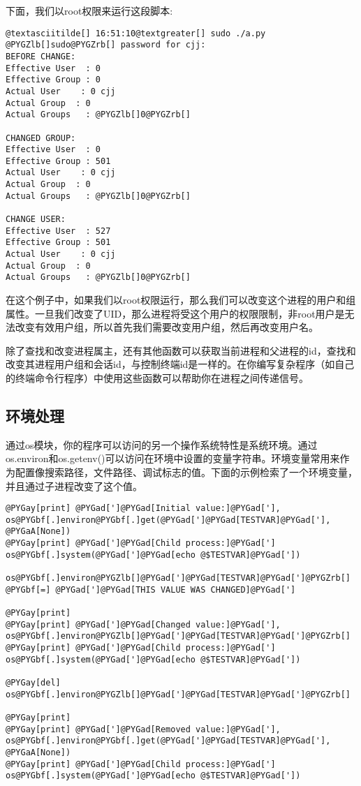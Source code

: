 \documentclass[letterpaper,10pt,english]{manual}
\begin{document}
下面，我们以root权限来运行这段脚本:

\begin{Verbatim}[commandchars=@\[\]]
@textasciitilde[] 16:51:10@textgreater[] sudo ./a.py
@PYGZlb[]sudo@PYGZrb[] password for cjj:
BEFORE CHANGE:
Effective User  : 0
Effective Group : 0
Actual User    : 0 cjj
Actual Group  : 0
Actual Groups   : @PYGZlb[]0@PYGZrb[]

CHANGED GROUP:
Effective User  : 0
Effective Group : 501
Actual User    : 0 cjj
Actual Group  : 0
Actual Groups   : @PYGZlb[]0@PYGZrb[]

CHANGE USER:
Effective User  : 527
Effective Group : 501
Actual User    : 0 cjj
Actual Group  : 0
Actual Groups   : @PYGZlb[]0@PYGZrb[]
\end{Verbatim}

在这个例子中，如果我们以root权限运行，那么我们可以改变这个进程的用户和组属性。一旦我们改变了UID，那么进程将受这个用户的权限限制，非root用户是无法改变有效用户组，所以首先我们需要改变用户组，然后再改变用户名。

除了查找和改变进程属主，还有其他函数可以获取当前进程和父进程的id，查找和改变其进程用户组和会话id，与控制终端id是一样的。在你编写复杂程序（如自己的终端命令行程序）中使用这些函数可以帮助你在进程之间传递信号。


\subsection{环境处理}

通过os模块，你的程序可以访问的另一个操作系统特性是系统环境。通过os.environ和os.getenv()可以访问在环境中设置的变量字符串。环境变量常用来作为配置像搜索路径，文件路径、调试标志的值。下面的示例检索了一个环境变量，并且通过子进程改变了这个值。

\begin{Verbatim}[commandchars=@\[\]]
@PYGay[print] @PYGad[']@PYGad[Initial value:]@PYGad['], os@PYGbf[.]environ@PYGbf[.]get(@PYGad[']@PYGad[TESTVAR]@PYGad['], @PYGaA[None])
@PYGay[print] @PYGad[']@PYGad[Child process:]@PYGad[']
os@PYGbf[.]system(@PYGad[']@PYGad[echo @$TESTVAR]@PYGad['])

os@PYGbf[.]environ@PYGZlb[]@PYGad[']@PYGad[TESTVAR]@PYGad[']@PYGZrb[] @PYGbf[=] @PYGad[']@PYGad[THIS VALUE WAS CHANGED]@PYGad[']

@PYGay[print]
@PYGay[print] @PYGad[']@PYGad[Changed value:]@PYGad['], os@PYGbf[.]environ@PYGZlb[]@PYGad[']@PYGad[TESTVAR]@PYGad[']@PYGZrb[]
@PYGay[print] @PYGad[']@PYGad[Child process:]@PYGad[']
os@PYGbf[.]system(@PYGad[']@PYGad[echo @$TESTVAR]@PYGad['])

@PYGay[del] os@PYGbf[.]environ@PYGZlb[]@PYGad[']@PYGad[TESTVAR]@PYGad[']@PYGZrb[]

@PYGay[print]
@PYGay[print] @PYGad[']@PYGad[Removed value:]@PYGad['], os@PYGbf[.]environ@PYGbf[.]get(@PYGad[']@PYGad[TESTVAR]@PYGad['], @PYGaA[None])
@PYGay[print] @PYGad[']@PYGad[Child process:]@PYGad[']
os@PYGbf[.]system(@PYGad[']@PYGad[echo @$TESTVAR]@PYGad['])
\end{Verbatim}
\end{document}
